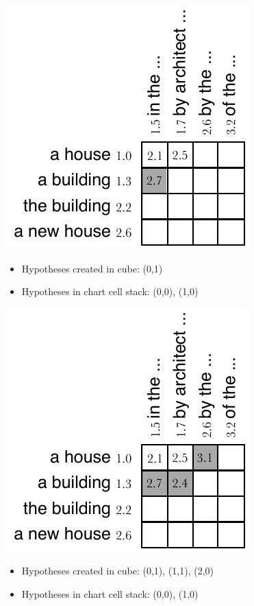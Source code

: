 \documentclass[landscape]{slides}
\begin{document}

\begin{center}
\includegraphics[scale=1.5]{cube-pruning-cube4.pdf}
\end{center}
\begin{itemize}
\item Hypotheses created in cube: (0,1)
\item Hypotheses in chart cell stack: (0,0), (1,0)
\end{itemize}


\begin{center}
\includegraphics[scale=1.5]{cube-pruning-cube5.pdf}
\end{center}
\begin{itemize}
\item Hypotheses created in cube: (0,1), (1,1), (2,0)
\item Hypotheses in chart cell stack: (0,0), (1,0)
\end{itemize}
\end{document}
